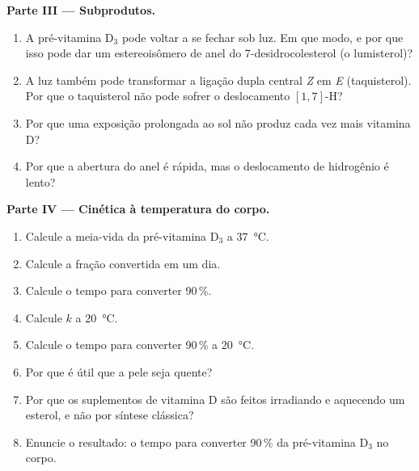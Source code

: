 \begin{problem}
\medskip\noindent\textbf{Parte III --- Subprodutos.}
\begin{enumerate}[resume]
  \item A pré-vitamina D$_3$ pode voltar a se fechar sob luz. Em que modo, e por que isso pode dar um
        estereoisômero de anel do 7-desidrocolesterol (o lumisterol)?
  \item A luz também pode transformar a ligação dupla central \textit{Z} em \textit{E} (taquisterol). Por que
        o taquisterol não pode sofrer o deslocamento $[1,7]$-H?
  \item Por que uma exposição prolongada ao sol não produz cada vez mais vitamina D?
  \item Por que a abertura do anel é rápida, mas o deslocamento de hidrogênio é lento?
\end{enumerate}

\medskip\noindent\textbf{Parte IV --- Cinética à temperatura do corpo.}
\begin{enumerate}[resume]
  \item Calcule a meia-vida da pré-vitamina D$_3$ a \qty{37}{\celsius}.
  \item Calcule a fração convertida em um dia.
  \item Calcule o tempo para converter 90\,\%.
  \item Calcule $k$ a \qty{20}{\celsius}.
  \item Calcule o tempo para converter 90\,\% a \qty{20}{\celsius}.
  \item Por que é útil que a pele seja quente?
  \item Por que os suplementos de vitamina D são feitos irradiando e aquecendo um
        esterol, e não por síntese clássica?
  \item Enuncie o resultado: o tempo para converter 90\,\% da pré-vitamina D$_3$ no corpo.
\end{enumerate}
\end{problem}
